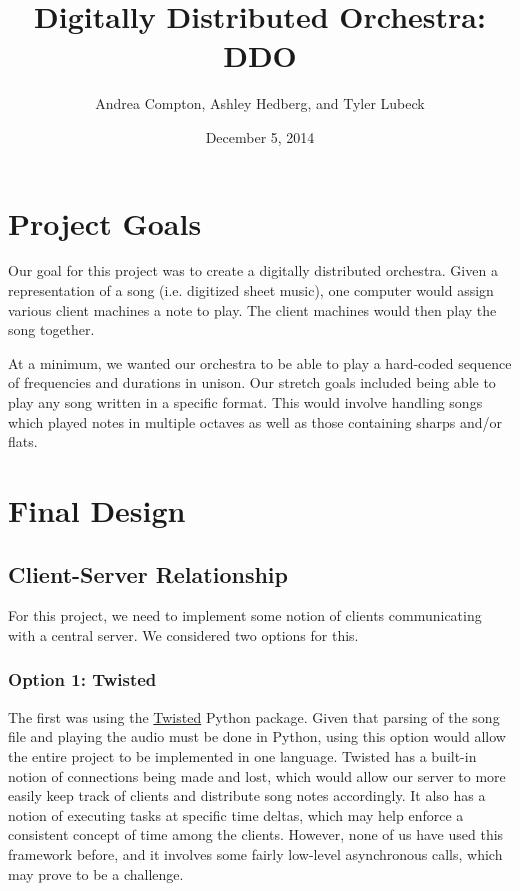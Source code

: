 \documentclass[12pt, letterpaper]{article}
\begin{document}
\title{Digitally Distributed Orchestra: DDO}
\author{Andrea Compton, Ashley Hedberg, and Tyler Lubeck}
\date{December 5, 2014}
\maketitle

\setcounter{tocdepth}{2}
\tableofcontents

\section{Project Goals}
Our goal for this project was to create a digitally distributed orchestra. Given a representation of a song (i.e. digitized sheet music), one computer would assign various client machines a note to play. The client machines would then play the song together.

At a minimum, we wanted our orchestra to be able to play a hard-coded sequence of frequencies and durations in unison. Our stretch goals included being able to play any song written in a specific format. This would involve handling songs which played notes in multiple octaves as well as those containing sharps and/or flats.

\section{Final Design}

\subsection{Client-Server Relationship}
For this project, we need to implement some notion of clients communicating with a central server. We considered two options for this.
            
\subsubsection{Option 1: Twisted}
The first was using the \href{https://twistedmatrix.com/}{Twisted} Python package. Given that parsing of the song file and playing the audio must be done in Python, using this option would allow the entire project to be implemented in one language. Twisted has a built-in notion of connections being made and lost, which would allow our server to more easily keep track of clients and distribute song notes accordingly. It also has a notion of executing tasks at specific time deltas, which may help enforce a consistent concept of time among the clients. However, none of us have used this framework before, and it involves some fairly low-level asynchronous calls, which may prove to be a challenge.
            
\end{document}

